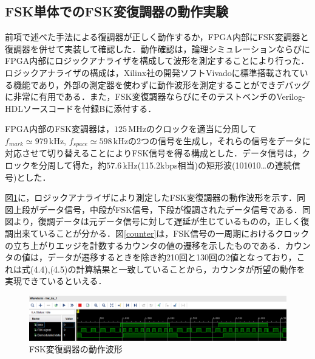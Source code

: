 \subsection{FSK単体でのFSK変復調器の動作実験}
前項で述べた手法による復調器が正しく動作するか，FPGA内部にFSK変調器と復調器を併せて実装して確認した．動作確認は，論理シミュレーションならびにFPGA内部にロジックアナライザを構成して波形を測定することにより行った．ロジックアナライザの構成は，Xilinx社の開発ソフトVivadoに標準搭載されている機能であり，外部の測定器を使わずに動作波形を測定することができデバッグに非常に有用である\cite{Kobayashi2018}．また，FSK変復調器ならびにそのテストベンチのVerilog-HDLソースコードを付録Bに添付する．\par
FPGA内部のFSK変調器は，$125 \, \mathrm{MHz}$のクロックを適当に分周して$f_{mark} \simeq 979 \, \mathrm{kHz}$, $f_{space} \simeq 598 \, \mathrm{kHz}$の2つの信号を生成し，それらの信号をデータに対応させて切り替えることによりFSK信号を得る構成とした．データ信号は，クロックを分周して得た，約$57.6 \, \mathrm{kHz}$(115.2kbps相当)の矩形波(101010…の連続信号)とした．\par 
図\ref{logicanalyzer}に，ロジックアナライザにより測定したFSK変復調器の動作波形を示す．同図上段がデータ信号，中段がFSK信号，下段が復調されたデータ信号である．同図より，復調データは元データ信号に対して遅延が生じているものの，正しく復調出来ていることが分かる．図\ref{counter}は，FSK信号の一周期におけるクロックの立ち上がりエッジを計数するカウンタの値の遷移を示したものである．カウンタの値は，データが遷移するときを除き約210回と130回の2値となっており，これは式(4.4),(4.5)の計算結果と一致していることから，カウンタが所望の動作を実現できているといえる．

\begin{figure}[b]
\begin{center}

\includegraphics[width=160mm]{figures/logicanalyzer.png}
\caption{FSK変復調器の動作波形}
\label{logicanalyzer}

\end{center}
\end{figure}

